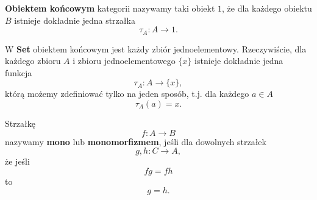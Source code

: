 \begin{definition}
	\textbf{Obiektem końcowym} kategorii nazywamy taki obiekt $1$,
	że dla każdego obiektu $B$ istnieje dokładnie jedna strzałka
	\begin{equation}
		\tau_A: A \to 1.
	\end{equation}
\end{definition}

\begin{example}
	W \textbf{Set} obiektem końcowym jest każdy zbiór jednoelementowy.
	Rzeczywiście, dla każdego zbioru $A$ i zbioru jednoelementowego $\{x\}$
	istnieje dokładnie jedna funkcja
	\begin{equation}
		\tau_A: A \to \{x\},
	\end{equation}
	którą możemy zdefiniować tylko na jeden sposób, t.j. dla każdego $a \in A$
	\begin{equation}
		\tau_A(a) = x.
	\end{equation}
\end{example}

\begin{definition}
	Strzałkę
	\begin{equation}
		f: A \to B
	\end{equation}
	nazywamy \textbf{mono} lub \textbf{monomorfizmem}, jeśli dla dowolnych strzałek
	\begin{equation}
		g, h: C \to A,
	\end{equation}
	że jeśli
	\begin{equation}
		fg = fh
	\end{equation}
	to
	\begin{equation}
		g = h.
	\end{equation}
\end{definition}

